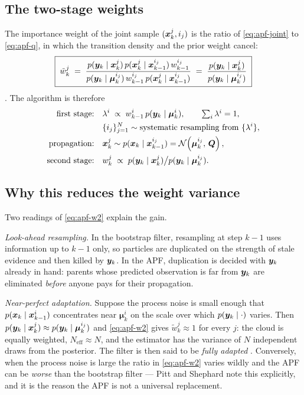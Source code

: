 \subsection{The two-stage weights}
The importance weight of the joint sample $(\bm{x}_k^j, i_j)$ is the ratio of \eqref{eq:apf-joint} to
\eqref{eq:apf-q}, in which the transition density and the prior weight cancel:
\begin{equation}
  \boxed{\;
  \tilde w_k^j \;=\;
  \frac{p(\bm{y}_k\mid\bm{x}_k^j)\, p(\bm{x}_k^j\mid\bm{x}_{k-1}^{i_j})\, w_{k-1}^{i_j}}
       {p(\bm{y}_k\mid\bm{\mu}_k^{i_j})\, w_{k-1}^{i_j}\, p(\bm{x}_k^j\mid\bm{x}_{k-1}^{i_j})}
  \;=\; \frac{p(\bm{y}_k\mid\bm{x}_k^j)}{p(\bm{y}_k\mid\bm{\mu}_k^{i_j})} \; }
  \label{eq:apf-w2}
\end{equation}
\cite[eq.~(69)]{arulampalam2002}.  The algorithm is therefore
\begin{align}
  \text{first stage:}\quad & \lambda^i \;\propto\; w_{k-1}^i\, p(\bm{y}_k\mid\bm{\mu}_k^i),
    \qquad \textstyle\sum_i \lambda^i = 1, \label{eq:apf-first}\\
  & \{i_j\}_{j=1}^N \sim \text{systematic resampling from } \{\lambda^i\}, \nonumber\\
  \text{propagation:}\quad & \bm{x}_k^j \sim p(\bm{x}_k \mid \bm{x}_{k-1}^{i_j}) = \mathcal{N}\!\left(\bm{\mu}_k^{i_j},\,\bm{Q}\right), \label{eq:apf-prop}\\
  \text{second stage:}\quad & w_k^j \;\propto\; p(\bm{y}_k\mid\bm{x}_k^j) \big/ p(\bm{y}_k\mid\bm{\mu}_k^{i_j}).
  \label{eq:apf-second}
\end{align}

\subsection{Why this reduces the weight variance}
Two readings of \eqref{eq:apf-w2} explain the gain.

\emph{Look-ahead resampling.}  In the bootstrap filter, resampling at step $k-1$ uses information
up to $k-1$ only, so particles are duplicated on the strength of stale evidence and then killed by
$\bm{y}_k$.  In the APF, duplication is decided with $\bm{y}_k$ already in hand: parents whose predicted
observation is far from $\bm{y}_k$ are eliminated \emph{before} anyone pays for their propagation.

\emph{Near-perfect adaptation.}  Suppose the process noise is small enough that
$p(\bm{x}_k\mid\bm{x}_{k-1}^i)$ concentrates near $\bm{\mu}_k^i$ on the scale over which
$p(\bm{y}_k\mid\cdot)$ varies.  Then $p(\bm{y}_k\mid\bm{x}_k^j)\approx p(\bm{y}_k\mid\bm{\mu}_k^{i_j})$ and
\eqref{eq:apf-w2} gives $\tilde w_k^j \approx 1$ for every $j$: the cloud is equally weighted,
$N_{\mathrm{eff}} \approx N$, and the estimator has the variance of $N$ independent draws from the
posterior.  The filter is then said to be \emph{fully adapted} \cite[\S3.2]{pitt1999auxiliary}.
Conversely, when the process noise is large the ratio in \eqref{eq:apf-w2} varies wildly and the
APF can be \emph{worse} than the bootstrap filter --- Pitt and Shephard note this explicitly, and
it is the reason the APF is not a universal replacement.

